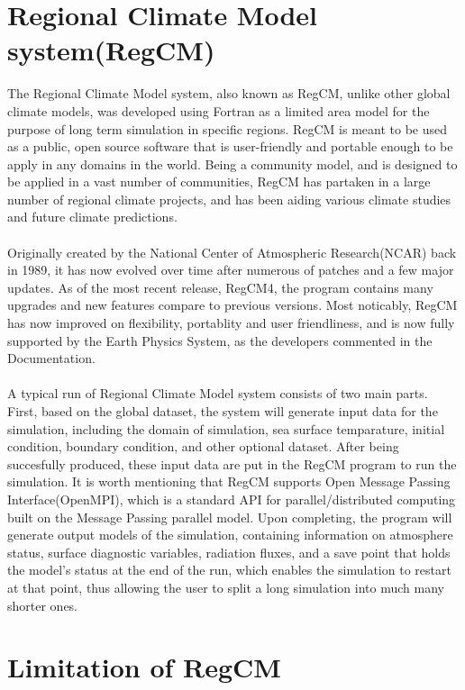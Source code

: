 \section{Regional Climate Model system(RegCM)}

The Regional Climate Model system, also known as RegCM, unlike other global climate models, was developed using Fortran as a limited area model for the purpose of long term simulation in specific regions. RegCM is meant to be used as a public, open source software that is user-friendly and portable enough to be apply in any domains in the world. Being a community model, and is designed to be applied in a vast number of communities, RegCM has partaken in a large number of regional climate projects, and has been aiding various climate studies and future climate predictions. \\
~\\
Originally created by the National Center of Atmospheric Research(NCAR) back in 1989, it has now evolved over time after numerous of patches and a few major updates. As of the most recent release, RegCM4, the program contains many upgrades and new features compare to previous versions. Most noticably, RegCM has now improved on flexibility, portablity and user friendliness, and is now fully supported by the Earth Physics System, as the developers commented in the Documentation. \\
~\\
A typical run of Regional Climate Model system consists of two main parts. First, based on the global dataset, the system will generate input data for the simulation, including the domain of simulation, sea surface temparature, initial condition, boundary condition, and other optional dataset. After being succesfully produced, these input data are put in the RegCM program to run the simulation. It is worth mentioning that RegCM supports Open Message Passing Interface(OpenMPI), which is a standard API for parallel/distributed computing built on the Message Passing parallel model. Upon completing, the program will generate output models of the simulation, containing information on atmosphere status, surface diagnostic variables, radiation fluxes, and a save point that holds the model's status at the end of the run, which enables the simulation to restart at that point, thus allowing the user to split a long simulation into much many shorter ones. \\

\section{Limitation of RegCM}

